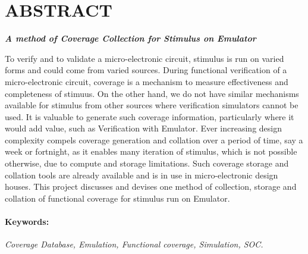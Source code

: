 \section*{\centering ABSTRACT}
\newcommand{\RNum}[1]{\uppercase\expandafter{\romannumeral #1\relax}}


\centerline{\emph{\bf A method of Coverage Collection for Stimulus on Emulator }}
\vspace{5pt}
To verify and to validate a micro-electronic circuit, stimulus is run on varied forms and could come from varied sources. During functional verification of a micro-electronic circuit, coverage is a mechanism to measure effectiveness and completeness of stimuus. On the other hand, we do not have similar mechanisms available for stimulus from other sources where verification simulators cannot be used. It is valuable to generate such coverage information, particularly where it would add value, such as Verification with Emulator. Ever increasing design complexity compels coverage generation and collation over a period of time, say a week or fortnight, as it enables many iteration of stimulus, which is not possible otherwise, due to compute and storage limitations. Such coverage storage and collation tools are already available and is in use in micro-electronic design houses. This project discusses and devises one method of collection, storage and collation of functional coverage for stimulus run on Emulator.



\paragraph{Keywords:}
 \emph{Coverage Database, Emulation, Functional coverage, Simulation, SOC.}



